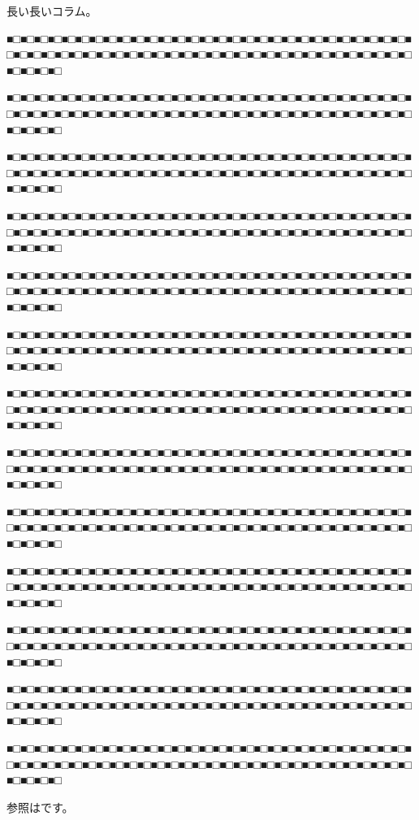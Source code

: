 \begin{reviewcolumn}

長い長いコラム。

■□■□■□■□■□■□■□■□■□■□■□■□■□■□■□■□■□■□■□■□■□■□■□■□■□■□■□■□■□■□■□■□■□■□■□■□■□■□■□■□■□■□■□■□■□■□■□■□■□■□■□■□■□■□■□■□■□■□■□■□■□■□■□

■□■□■□■□■□■□■□■□■□■□■□■□■□■□■□■□■□■□■□■□■□■□■□■□■□■□■□■□■□■□■□■□■□■□■□■□■□■□■□■□■□■□■□■□■□■□■□■□■□■□■□■□■□■□■□■□■□■□■□■□■□■□■□

■□■□■□■□■□■□■□■□■□■□■□■□■□■□■□■□■□■□■□■□■□■□■□■□■□■□■□■□■□■□■□■□■□■□■□■□■□■□■□■□■□■□■□■□■□■□■□■□■□■□■□■□■□■□■□■□■□■□■□■□■□■□■□

■□■□■□■□■□■□■□■□■□■□■□■□■□■□■□■□■□■□■□■□■□■□■□■□■□■□■□■□■□■□■□■□■□■□■□■□■□■□■□■□■□■□■□■□■□■□■□■□■□■□■□■□■□■□■□■□■□■□■□■□■□■□■□

■□■□■□■□■□■□■□■□■□■□■□■□■□■□■□■□■□■□■□■□■□■□■□■□■□■□■□■□■□■□■□■□■□■□■□■□■□■□■□■□■□■□■□■□■□■□■□■□■□■□■□■□■□■□■□■□■□■□■□■□■□■□■□

■□■□■□■□■□■□■□■□■□■□■□■□■□■□■□■□■□■□■□■□■□■□■□■□■□■□■□■□■□■□■□■□■□■□■□■□■□■□■□■□■□■□■□■□■□■□■□■□■□■□■□■□■□■□■□■□■□■□■□■□■□■□■□

■□■□■□■□■□■□■□■□■□■□■□■□■□■□■□■□■□■□■□■□■□■□■□■□■□■□■□■□■□■□■□■□■□■□■□■□■□■□■□■□■□■□■□■□■□■□■□■□■□■□■□■□■□■□■□■□■□■□■□■□■□■□■□

■□■□■□■□■□■□■□■□■□■□■□■□■□■□■□■□■□■□■□■□■□■□■□■□■□■□■□■□■□■□■□■□■□■□■□■□■□■□■□■□■□■□■□■□■□■□■□■□■□■□■□■□■□■□■□■□■□■□■□■□■□■□■□

■□■□■□■□■□■□■□■□■□■□■□■□■□■□■□■□■□■□■□■□■□■□■□■□■□■□■□■□■□■□■□■□■□■□■□■□■□■□■□■□■□■□■□■□■□■□■□■□■□■□■□■□■□■□■□■□■□■□■□■□■□■□■□

■□■□■□■□■□■□■□■□■□■□■□■□■□■□■□■□■□■□■□■□■□■□■□■□■□■□■□■□■□■□■□■□■□■□■□■□■□■□■□■□■□■□■□■□■□■□■□■□■□■□■□■□■□■□■□■□■□■□■□■□■□■□■□

■□■□■□■□■□■□■□■□■□■□■□■□■□■□■□■□■□■□■□■□■□■□■□■□■□■□■□■□■□■□■□■□■□■□■□■□■□■□■□■□■□■□■□■□■□■□■□■□■□■□■□■□■□■□■□■□■□■□■□■□■□■□■□

■□■□■□■□■□■□■□■□■□■□■□■□■□■□■□■□■□■□■□■□■□■□■□■□■□■□■□■□■□■□■□■□■□■□■□■□■□■□■□■□■□■□■□■□■□■□■□■□■□■□■□■□■□■□■□■□■□■□■□■□■□■□■□

■□■□■□■□■□■□■□■□■□■□■□■□■□■□■□■□■□■□■□■□■□■□■□■□■□■□■□■□■□■□■□■□■□■□■□■□■□■□■□■□■□■□■□■□■□■□■□■□■□■□■□■□■□■□■□■□■□■□■□■□■□■□■□

\end{reviewcolumn}

参照はです。
